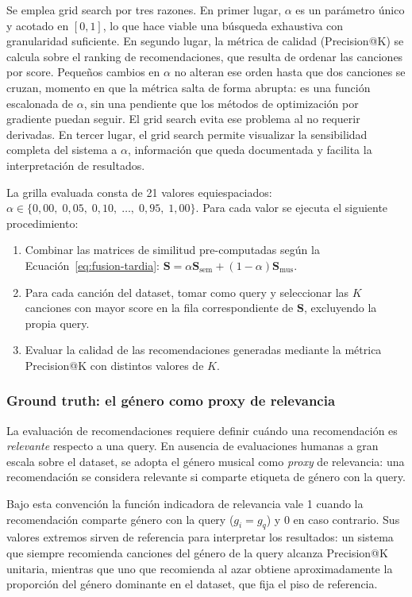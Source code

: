 Se emplea grid search por tres razones. En primer lugar, $\alpha$ es un parámetro único y acotado en $[0, 1]$, lo que hace viable una búsqueda exhaustiva con granularidad suficiente. En segundo lugar, la métrica de calidad (Precision@K) se calcula sobre el ranking de recomendaciones, que resulta de ordenar las canciones por score. Pequeños cambios en $\alpha$ no alteran ese orden hasta que dos canciones se cruzan, momento en que la métrica salta de forma abrupta: es una función escalonada de $\alpha$, sin una pendiente que los métodos de optimización por gradiente puedan seguir. El grid search evita ese problema al no requerir derivadas. En tercer lugar, el grid search permite visualizar la sensibilidad completa del sistema a $\alpha$, información que queda documentada y facilita la interpretación de resultados.

La grilla evaluada consta de 21 valores equiespaciados: $\alpha \in \{0{,}00,\; 0{,}05,\; 0{,}10,\; \ldots,\; 0{,}95,\; 1{,}00\}$. Para cada valor se ejecuta el siguiente procedimiento:

\begin{enumerate}[leftmargin=2em]
    \item Combinar las matrices de similitud pre-computadas según la Ecuación~\ref{eq:fusion-tardia}: $\mathbf{S} = \alpha \mathbf{S}_{\text{sem}} + (1 - \alpha) \mathbf{S}_{\text{mus}}$.
    \item Para cada canción del dataset, tomar como query y seleccionar las $K$ canciones con mayor score en la fila correspondiente de $\mathbf{S}$, excluyendo la propia query.
    \item Evaluar la calidad de las recomendaciones generadas mediante la métrica Precision@K con distintos valores de $K$.
\end{enumerate}

\subsubsection*{Ground truth: el género como proxy de relevancia}

La evaluación de recomendaciones requiere definir cuándo una recomendación es \textit{relevante} respecto a una query. En ausencia de evaluaciones humanas a gran escala sobre el dataset, se adopta el género musical como \textit{proxy} de relevancia: una recomendación se considera relevante si comparte etiqueta de género con la query.

Bajo esta convención la función indicadora de relevancia vale 1 cuando la recomendación comparte género con la query ($g_i = g_q$) y 0 en caso contrario. Sus valores extremos sirven de referencia para interpretar los resultados: un sistema que siempre recomienda canciones del género de la query alcanza Precision@K unitaria, mientras que uno que recomienda al azar obtiene aproximadamente la proporción del género dominante en el dataset, que fija el piso de referencia.

